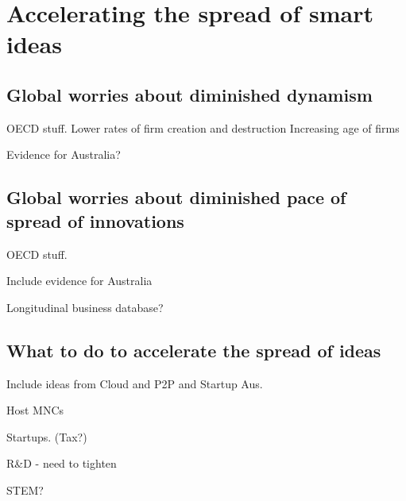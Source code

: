 \chapter{Accelerating the spread of smart ideas} \label{chap4}

\section{Global worries about diminished dynamism}

OECD stuff.
Lower rates of firm creation and destruction
Increasing age of firms

Evidence for Australia?



\section{Global worries about diminished pace of spread of innovations}
OECD stuff.

Include evidence for Australia

Longitudinal business database?

\section{What to do to accelerate the spread of ideas}

Include ideas from Cloud and P2P and Startup Aus. 

Host MNCs

Startups. (Tax?)


R\&D - need to tighten

STEM? 

